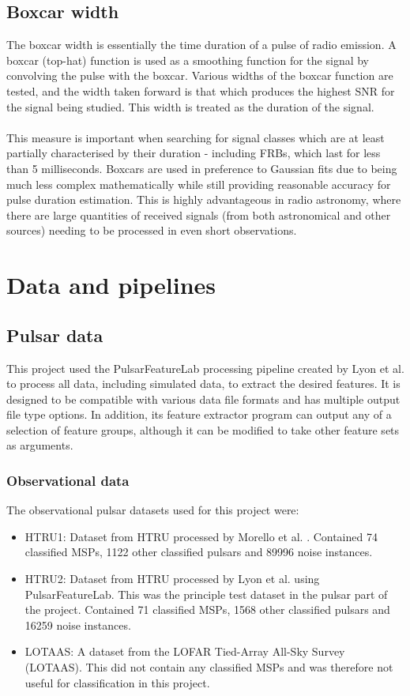 \documentclass[12pt]{article}
\begin{document}
\subsection{Boxcar width}
The boxcar width is essentially the time duration of a pulse of radio emission. A boxcar (top-hat) function is used as a smoothing function for the signal by convolving the pulse with the boxcar. Various widths of the boxcar function are tested, and the width taken forward is that which produces the highest SNR for the signal being studied. This width is treated as the duration of the signal.
\paragraph{}
This measure is important when searching for signal classes which are at least partially characterised by their duration - including FRBs, which last for less than 5 milliseconds. Boxcars are used in preference to Gaussian fits due to being much less complex mathematically while still providing reasonable accuracy for pulse duration estimation. This is highly advantageous in radio astronomy, where there are large quantities of received signals (from both astronomical and other sources) needing to be processed in even short observations.

\section{Data and pipelines}
\subsection{Pulsar data}
This project used the PulsarFeatureLab processing pipeline created by Lyon et al. \cite{lyon2016fifty} to process all data, including simulated data, to extract the desired features. It is designed to be compatible with various data file formats and has multiple output file type options. In addition, its feature extractor program can output any of a selection of feature groups, although it can be modified to take other feature sets as arguments.

\subsubsection{Observational data}
The observational pulsar datasets used for this project were:
\begin{itemize}
\item HTRU1: Dataset from HTRU processed by Morello et al. \cite{morello2014spinn}. Contained 74 classified MSPs, 1122 other classified pulsars and 89996 noise instances.
\item HTRU2: Dataset from HTRU processed by Lyon et al. \cite{lyon2016fifty} using PulsarFeatureLab. This was the principle test dataset in the pulsar part of the project. Contained 71 classified MSPs, 1568 other classified pulsars and 16259 noise instances.
\item LOTAAS: A dataset from the LOFAR Tied-Array All-Sky Survey (LOTAAS). This did not contain any classified MSPs and was therefore not useful for classification in this project.
\end{itemize}
\end{document}
